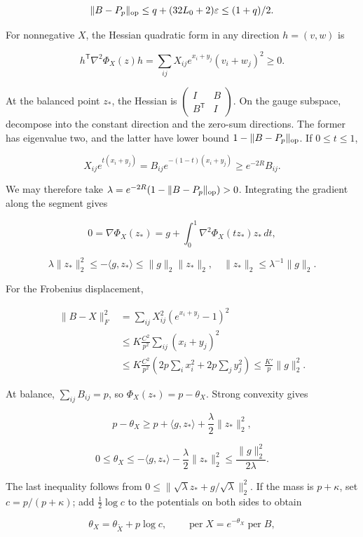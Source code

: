 \documentclass[11pt,a4paper]{article}
\begin{document}
\[
\|B-P_p\|_{\rm op}\le q+(32L_0+2)\varepsilon\le(1+q)/2.
\]

For nonnegative \(X\), the Hessian quadratic form in any direction \(h=(v,w)\) is

\[
h^{\mathsf T}\nabla^2\Phi_X(z)h
=\sum_{ij}X_{ij}e^{x_i+y_j}(v_i+w_j)^2\ge0.
\]

At the balanced point \(z_*\), the Hessian is \(\left(\begin{smallmatrix}I&B\\B^{\mathsf T}&I\end{smallmatrix}\right)\). On the gauge subspace, decompose into the constant direction and the zero-sum directions. The former has eigenvalue two, and the latter have lower bound \(1-\|B-P_p\|_{\rm op}\). If \(0\le t\le1\),

\[
X_{ij}e^{t(x_i+y_j)}=B_{ij}e^{-(1-t)(x_i+y_j)}\ge e^{-2R}B_{ij}.
\]

We may therefore take \(\lambda=e^{-2R}(1-\|B-P_p\|_{\rm op})>0\). Integrating the gradient along the segment gives

\[
0=\nabla\Phi_X(z_*)=g+\int_0^1\nabla^2\Phi_X(tz_*)z_*\,dt,
\]

\[
\lambda\|z_*\|_2^2\le-\langle g,z_*\rangle\le\|g\|_2\|z_*\|_2,
\quad\|z_*\|_2\le\lambda^{-1}\|g\|_2.
\]

For the Frobenius displacement,

\[
\begin{aligned}
\|B-X\|_F^2
&=\sum_{ij}X_{ij}^2(e^{x_i+y_j}-1)^2\\
&\le K\frac{C^2}{p^2}\sum_{ij}(x_i+y_j)^2\\
&\le K\frac{C^2}{p^2}\left(2p\sum_ix_i^2+2p\sum_jy_j^2\right)
\le\frac{K'}p\|g\|_2^2.
\end{aligned}
\]

At balance, \(\sum_{ij}B_{ij}=p\), so \(\Phi_X(z_*)=p-\theta_X\). Strong convexity gives

\[
p-\theta_X\ge p+\langle g,z_*\rangle+\frac\lambda2\|z_*\|_2^2,
\]

\[
0\le\theta_X\le-\langle g,z_*\rangle-\frac\lambda2\|z_*\|_2^2
\le\frac{\|g\|_2^2}{2\lambda}.
\]

The last inequality follows from \(0\le\|\sqrt\lambda z_*+g/\sqrt\lambda\|_2^2\). If the mass is \(p+\kappa\), set \(c=p/(p+\kappa)\); add \(\tfrac12\log c\) to the potentials on both sides to obtain

\[
\theta_X=\theta_{\widetilde X}+p\log c,\qquad
\operatorname{per}X=e^{-\theta_X}\operatorname{per}B,
\]
\end{document}
